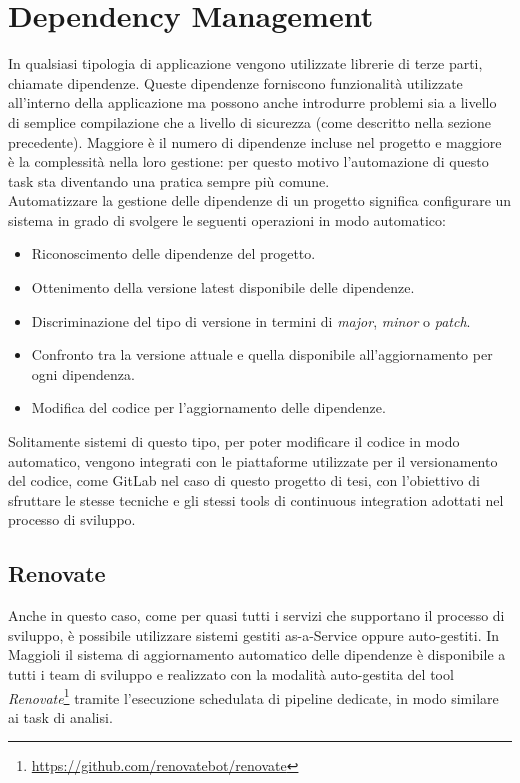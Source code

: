 \section{Dependency Management}
In qualsiasi tipologia di applicazione vengono utilizzate librerie di terze parti, chiamate dipendenze. Queste dipendenze forniscono funzionalità utilizzate all'interno della applicazione ma possono anche introdurre problemi sia a livello di semplice compilazione che a livello di sicurezza (come descritto nella sezione precedente). Maggiore è il numero di dipendenze incluse nel progetto e maggiore è la complessità nella loro gestione: per questo motivo l'automazione di questo task sta diventando una pratica sempre più comune.\\
Automatizzare la gestione delle dipendenze di un progetto significa configurare un sistema in grado di svolgere le seguenti operazioni in modo automatico:
\begin{itemize}
    \item Riconoscimento delle dipendenze del progetto.
    \item Ottenimento della versione latest disponibile delle dipendenze.
    \item Discriminazione del tipo di versione in termini di \textit{major}, \textit{minor} o \textit{patch}.
    \item Confronto tra la versione attuale e quella disponibile all'aggiornamento per ogni dipendenza.
    \item Modifica del codice per l'aggiornamento delle dipendenze.
\end{itemize}

Solitamente sistemi di questo tipo, per poter modificare il codice in modo automatico, vengono integrati con le piattaforme utilizzate per il versionamento del codice, come GitLab nel caso di questo progetto di tesi, con l'obiettivo di sfruttare le stesse tecniche e gli stessi tools di continuous integration adottati nel processo di sviluppo.

\subsection{Renovate}
Anche in questo caso, come per quasi tutti i servizi che supportano il processo di sviluppo, è possibile utilizzare sistemi gestiti as-a-Service oppure auto-gestiti. In Maggioli il sistema di aggiornamento automatico delle dipendenze è disponibile a tutti i team di sviluppo e realizzato con la modalità auto-gestita del tool \textit{Renovate}\footnote{\url{https://github.com/renovatebot/renovate}} tramite l'esecuzione schedulata di pipeline dedicate, in modo similare ai task di analisi.

